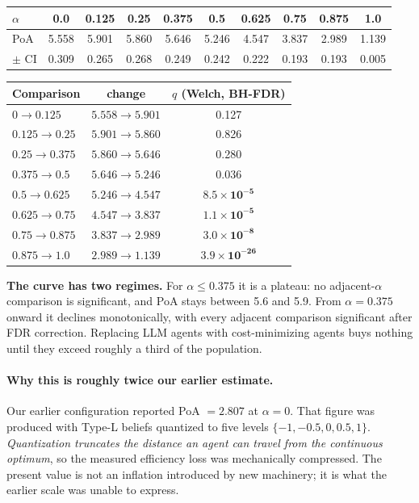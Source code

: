 \begin{center}
\begin{tabular}{lccccccccc}
\toprule
$\alpha$ & 0.0 & 0.125 & 0.25 & 0.375 & 0.5 & 0.625 & 0.75 & 0.875 & 1.0 \\
\midrule
PoA      & 5.558 & 5.901 & 5.860 & 5.646 & 5.246 & 4.547 & 3.837 & 2.989 & 1.139 \\
$\pm$ CI & 0.309 & 0.265 & 0.268 & 0.249 & 0.242 & 0.222 & 0.193 & 0.193 & 0.005 \\
\bottomrule
\end{tabular}
\end{center}

\begin{center}
\begin{tabular}{lcc}
\toprule
Comparison & change & $q$ (Welch, BH-FDR) \\
\midrule
$0 \to 0.125$      & $5.558 \to 5.901$ & 0.127 \\
$0.125 \to 0.25$   & $5.901 \to 5.860$ & 0.826 \\
$0.25 \to 0.375$   & $5.860 \to 5.646$ & 0.280 \\
$0.375 \to 0.5$    & $5.646 \to 5.246$ & $\mathbf{0.036}$ \\
$0.5 \to 0.625$    & $5.246 \to 4.547$ & $\mathbf{8.5\times10^{-5}}$ \\
$0.625 \to 0.75$   & $4.547 \to 3.837$ & $\mathbf{1.1\times10^{-5}}$ \\
$0.75 \to 0.875$   & $3.837 \to 2.989$ & $\mathbf{3.0\times10^{-8}}$ \\
$0.875 \to 1.0$    & $2.989 \to 1.139$ & $\mathbf{3.9\times10^{-26}}$ \\
\bottomrule
\end{tabular}
\end{center}

\textbf{The curve has two regimes.} For $\alpha \le 0.375$ it is a plateau: no
adjacent-$\alpha$ comparison is significant, and PoA stays between 5.6 and 5.9. From
$\alpha = 0.375$ onward it declines monotonically, with every adjacent comparison
significant after FDR correction. Replacing LLM agents with cost-minimizing agents buys
nothing until they exceed roughly a third of the population.

\paragraph{Why this is roughly twice our earlier estimate.}
Our earlier configuration reported PoA $= 2.807$ at $\alpha = 0$. That figure was
produced with Type-L beliefs quantized to five levels
$\{-1, -0.5, 0, 0.5, 1\}$. \emph{Quantization truncates the distance an agent can
travel from the continuous optimum}, so the measured efficiency loss was mechanically
compressed. The present value is not an inflation introduced by new machinery; it is
what the earlier scale was unable to express.

